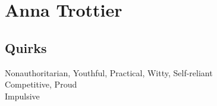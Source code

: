 \section*{Anna Trottier}
\subsection*{Quirks}
Nonauthoritarian, Youthful, Practical, Witty, Self-reliant\\
Competitive, Proud\\
Impulsive